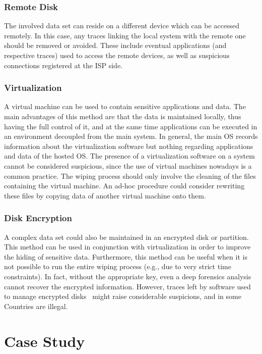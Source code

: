 \documentclass[conference]{IEEEtran}
\begin{document}
\subsubsection{Remote Disk}
The involved data set can reside on a different device which can be accessed remotely. In this case, any traces linking the local system with the remote one should be removed or avoided. These include eventual applications (and respective traces) used to access the remote devices, as well as suspicious connections registered at the ISP side.

\subsubsection{Virtualization}
A virtual machine can be used to contain sensitive applications and data. The main advantages of this method are that the data is maintained locally, thus having the full control of it, and at the same time applications can be executed in an environment decoupled from the main system. In general, the main OS records information about the virtualization software but nothing regarding applications and data of the hosted OS. The presence of a virtualization software on a system cannot be considered suspicious, since the use of virtual machines nowadays is a common practice.
The wiping process should only involve the cleaning of the files containing the virtual machine. An ad-hoc procedure could consider rewriting these files by copying data of another virtual machine onto them.

\subsubsection{Disk Encryption}
A complex data set could also be maintained in an encrypted disk or partition. This method can be used in conjunction with virtualization in order to improve the hiding of sensitive data. Furthermore, this method can be useful when it is not possible to run the entire wiping process (e.g., due to very strict time constraints). In fact, without the appropriate key, even a deep forensics analysis cannot recover the encrypted information. However, traces left by software used to manage encrypted disks~\cite{diskenc} might raise considerable suspicions, and in some Countries are illegal.


\section{Case Study}
\label{case}
\end{document}
